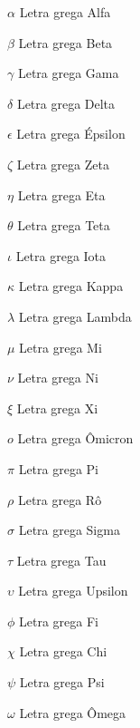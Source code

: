 
\begin{simbolos}
    \item[$\alpha$]   Letra grega Alfa
    \item[$\beta$]    Letra grega Beta
    \item[$\gamma$]   Letra grega Gama
    \item[$\delta$]   Letra grega Delta
    \item[$\epsilon$] Letra grega Épsilon
    \item[$\zeta$]    Letra grega Zeta
    \item[$\eta$]     Letra grega Eta
    \item[$\theta$]   Letra grega Teta
    \item[$\iota$]    Letra grega Iota
    \item[$\kappa$]   Letra grega Kappa
    \item[$\lambda$]  Letra grega Lambda
    \item[$\mu$]      Letra grega Mi
    \item[$\nu$]      Letra grega Ni
    \item[$\xi$]      Letra grega Xi
    \item[$o$]        Letra grega Ômicron
    \item[$\pi$]      Letra grega Pi
    \item[$\rho$]     Letra grega Rô
    \item[$\sigma$]   Letra grega Sigma
    \item[$\tau$]     Letra grega Tau
    \item[$\upsilon$] Letra grega Upsilon
    \item[$\phi$]     Letra grega Fi
    \item[$\chi$]     Letra grega Chi
    \item[$\psi$]     Letra grega Psi
    \item[$\omega$]   Letra grega Ômega
\end{simbolos}

